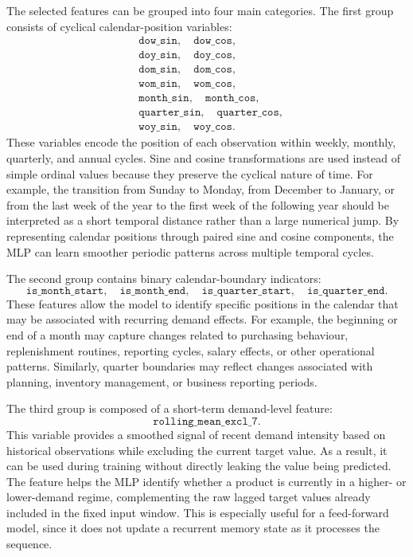 The selected features can be grouped into four main categories. The first group consists of cyclical calendar-position variables:
\[
\begin{split}
&\texttt{dow\_sin},\quad \texttt{dow\_cos},\\
&\texttt{doy\_sin},\quad \texttt{doy\_cos},\\
&\texttt{dom\_sin},\quad \texttt{dom\_cos},\\
&\texttt{wom\_sin},\quad \texttt{wom\_cos},\\
&\texttt{month\_sin},\quad \texttt{month\_cos},\\
&\texttt{quarter\_sin},\quad \texttt{quarter\_cos},\\
&\texttt{woy\_sin},\quad \texttt{woy\_cos}.
\end{split}
\]
These variables encode the position of each observation within weekly, monthly, quarterly, and annual cycles. Sine and cosine transformations are used instead of simple ordinal values because they preserve the cyclical nature of time. For example, the transition from Sunday to Monday, from December to January, or from the last week of the year to the first week of the following year should be interpreted as a short temporal distance rather than a large numerical jump. By representing calendar positions through paired sine and cosine components, the MLP can learn smoother periodic patterns across multiple temporal cycles.

The second group contains binary calendar-boundary indicators:
\[
\texttt{is\_month\_start},\quad
\texttt{is\_month\_end},\quad
\texttt{is\_quarter\_start},\quad
\texttt{is\_quarter\_end}.
\]
These features allow the model to identify specific positions in the calendar that may be associated with recurring demand effects. For example, the beginning or end of a month may capture changes related to purchasing behaviour, replenishment routines, reporting cycles, salary effects, or other operational patterns. Similarly, quarter boundaries may reflect changes associated with planning, inventory management, or business reporting periods.

The third group is composed of a short-term demand-level feature:
\[
\texttt{rolling\_mean\_excl\_7}.
\]
This variable provides a smoothed signal of recent demand intensity based on historical observations while excluding the current target value. As a result, it can be used during training without directly leaking the value being predicted. The feature helps the MLP identify whether a product is currently in a higher- or lower-demand regime, complementing the raw lagged target values already included in the fixed input window. This is especially useful for a feed-forward model, since it does not update a recurrent memory state as it processes the sequence.

